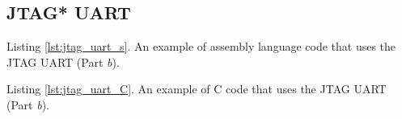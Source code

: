 \subsection{JTAG* UART}

\expandparam

\newpage
\expandparam

\begin{center}
Listing \ref{lst:jtag_uart_s}. An example of assembly language code that uses the JTAG UART (Part {\it b}).
\end{center}
\newpage


\newpage

\begin{center}
Listing \ref{lst:jtag_uart_C}. An example of C code that uses the JTAG UART (Part {\it b}).
\end{center}
\newpage

